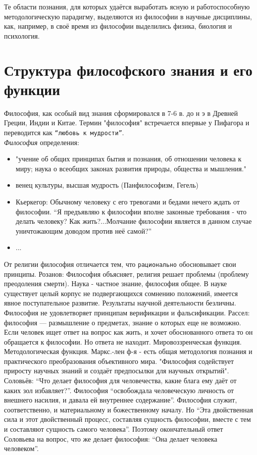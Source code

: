 \documentclass[12pt]{article}
\begin{document}
Те области познания, для которых удаётся выработать ясную и работоспособную методологическую парадигму,
выделяются из философии в научные дисциплины, как, например, в своё время из философии выделились физика,
биология и психология.


\newpage
\section{Структура философского знания и его функции}
Философия, как особый вид знания сформировался в 7-6 в. до н э в Древней Греции, Индии и Китае. Термин
"философия" встречается впервые у Пифагора и переводится как \texttt{“любовь к мудрости”}. \\
\textit{Философия} определения:
\begin{itemize}
\item "учение об общих принципах бытия и познания, об отношении человека к миру;
	наука о всеобщих законах развития природы, общества и мышления."
\item венец культуры, высшая мудрость (Панфилософизм, Гегель)
\item Кьеркегор: Обычному человеку с его тревогами и бедами нечего ждать от философии.
	“Я предъявляю к философии вполне законные требования - что делать человеку?
	Как жить?...Молчание философии является в данном случае уничтожающим доводом против неё самой?”
\item ...
\end{itemize}
От религии философия отличается тем, что \texttt{рационально} обосновывает свои принципы.
Розанов: Философия объясняет, религия решает проблемы (проблему преодоления смерти).
Наука - частное знание, философия общее.
В науке существует целый корпус не подвергающихся сомнению положений, имеется явное поступательное развитие.
Результаты научной деятельности безличны.
Философия не удовлетворяет принципам верификации и фальсификации.
Рассел: философия --- размышление о предметах, знание о которых еще не возможно.
Если человек ищет ответ на вопрос как жить, и хочет обоснованного ответа то он обращается к философии.
Но ответа не находит.
Мировоззренческая функция. Методологическая функция.
Маркс.-лен ф-я - есть общая методология познания и практического преобразования объективного мира.
"Философия содействует приросту научных знаний и создаёт предпосылки для научных открытий".
Соловьёв: “Что делает философия для человечества, какие блага ему даёт от каких зол избавляет?”. 
Философия “освобождала человеческую личность от внешнего насилия, и давала ей внутреннее содержание”.
Философия служит, соответственно, и материальному и божественному началу. Но “Эта двойственная сила и
этот двойственный процесс, составляя сущность философии, вместе с тем и составляют сущность самого
человека”. Поэтому окончательный ответ Соловьева на вопрос, что же делает философия: “Она делает человека
человеком”.
\end{document}
